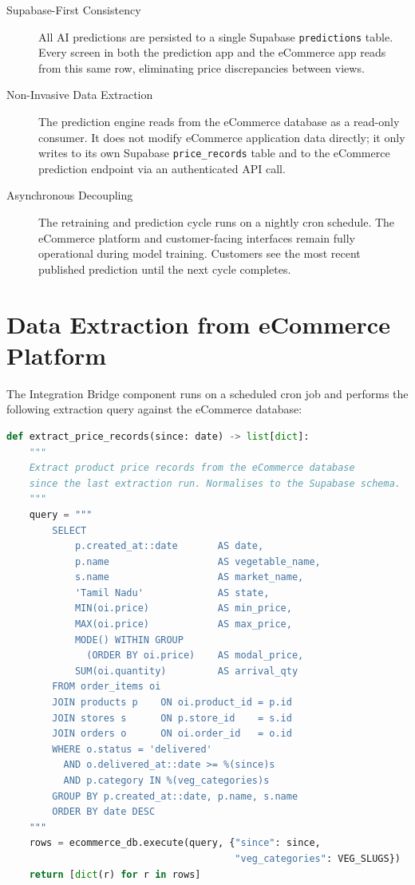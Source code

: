 \documentclass[12pt, a4paper, oneside]{report}
\begin{document}
\begin{description}
  \item[Supabase-First Consistency]
    All AI predictions are persisted to a single Supabase \texttt{predictions}
    table. Every screen in both the prediction app and the eCommerce app reads
    from this same row, eliminating price discrepancies between views.

  \item[Non-Invasive Data Extraction]
    The prediction engine reads from the eCommerce database as a read-only
    consumer. It does not modify eCommerce application data directly; it only
    writes to its own Supabase \texttt{price\_records} table and to the
    eCommerce prediction endpoint via an authenticated API call.

  \item[Asynchronous Decoupling]
    The retraining and prediction cycle runs on a nightly cron schedule.
    The eCommerce platform and customer-facing interfaces remain fully
    operational during model training. Customers see the most recent published
    prediction until the next cycle completes.
\end{description}

\section{Data Extraction from eCommerce Platform}

The Integration Bridge component runs on a scheduled cron job and performs the
following extraction query against the eCommerce database:

\begin{lstlisting}[language=Python, numbers=none,
  caption={Nightly price record extraction from eCommerce DB}]
def extract_price_records(since: date) -> list[dict]:
    """
    Extract product price records from the eCommerce database
    since the last extraction run. Normalises to the Supabase schema.
    """
    query = """
        SELECT
            p.created_at::date       AS date,
            p.name                   AS vegetable_name,
            s.name                   AS market_name,
            'Tamil Nadu'             AS state,
            MIN(oi.price)            AS min_price,
            MAX(oi.price)            AS max_price,
            MODE() WITHIN GROUP
              (ORDER BY oi.price)    AS modal_price,
            SUM(oi.quantity)         AS arrival_qty
        FROM order_items oi
        JOIN products p    ON oi.product_id = p.id
        JOIN stores s      ON p.store_id    = s.id
        JOIN orders o      ON oi.order_id   = o.id
        WHERE o.status = 'delivered'
          AND o.delivered_at::date >= %(since)s
          AND p.category IN %(veg_categories)s
        GROUP BY p.created_at::date, p.name, s.name
        ORDER BY date DESC
    """
    rows = ecommerce_db.execute(query, {"since": since,
                                        "veg_categories": VEG_SLUGS})
    return [dict(r) for r in rows]
\end{lstlisting}
\end{document}
